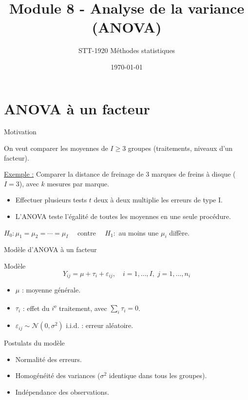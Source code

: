 \documentclass{BeamerTemplate}
\title{Module 8 - Analyse de la variance (ANOVA)}
\subtitle{STT-1920 Méthodes statistiques}
\date{\today}
\begin{document}
\begin{frame}[t]
  \titlepage
\end{frame}

\section{ANOVA à un facteur}

\begin{frame}[t]{Motivation}

On veut comparer les moyennes de \alert{$I \ge 3$ groupes} (traitements, niveaux d'un facteur).

\bigskip
\underline{Exemple :} Comparer la distance de freinage de 3 marques de freins à disque ($I=3$), avec $k$ mesures par marque.

\bigskip
\begin{itemize}\itemsep4mm
  \item Effectuer plusieurs tests $t$ deux à deux multiplie les erreurs de type I.
  \item L'ANOVA teste l'égalité de toutes les moyennes en une seule procédure.
\end{itemize}

\bigskip
$H_0 : \mu_1 = \mu_2 = \cdots = \mu_I \quad$ contre $\quad H_1 :$ au moins une $\mu_i$ diffère.

\end{frame}

\begin{frame}[t]{Modèle d'ANOVA à un facteur}

\begin{Boite}{Modèle}
$$Y_{ij} = \mu + \tau_i + \varepsilon_{ij}, \quad i=1,\ldots,I,\; j=1,\ldots,n_i$$
\end{Boite}

\begin{itemize}\itemsep4mm
  \item $\mu$ : moyenne générale.
  \item $\tau_i$ : effet du $i$\textsuperscript{e} traitement, avec $\sum_i \tau_i = 0$.
  \item $\varepsilon_{ij} \sim \mathcal{N}(0, \sigma^2)$ i.i.d. : erreur aléatoire.
\end{itemize}

\bigskip
\begin{Boite}{Postulats du modèle}
\begin{itemize}
  \item Normalité des erreurs.
  \item Homogénéité des variances ($\sigma^2$ identique dans tous les groupes).
  \item Indépendance des observations.
\end{itemize}
\end{Boite}

\end{frame}
\end{document}
